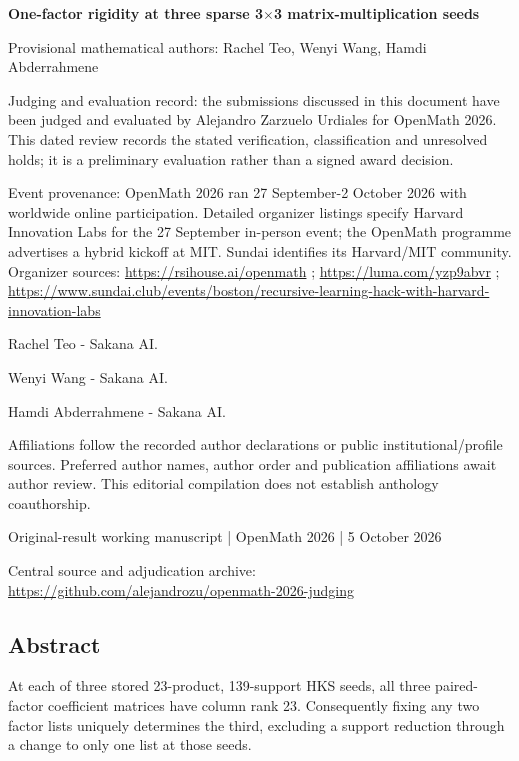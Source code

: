 \documentclass[11pt,a4paper]{article}
\begin{document}
{\LARGE\bfseries One-factor rigidity at three sparse 3\ensuremath{\times}3 matrix-multiplication seeds\par}\medskip
{\small Provisional mathematical authors: Rachel Teo, Wenyi Wang, Hamdi Abderrahmene\par}\medskip
{\small Judging and evaluation record: the submissions discussed in this document have been judged and evaluated by Alejandro Zarzuelo Urdiales for OpenMath 2026. This dated review records the stated verification, classification and unresolved holds; it is a preliminary evaluation rather than a signed award decision.\par}

{\small Event provenance: OpenMath 2026 ran 27 September-2 October 2026 with worldwide online participation. Detailed organizer listings specify Harvard Innovation Labs for the 27 September in-person event; the OpenMath programme advertises a hybrid kickoff at MIT. Sundai identifies its Harvard/MIT community. Organizer sources: \url{https://rsihouse.ai/openmath} ; \url{https://luma.com/yzp9abvr} ; \url{https://www.sundai.club/events/boston/recursive-learning-hack-with-harvard-innovation-labs}\par}

{\small Rachel Teo  -  Sakana AI.\par}

{\small Wenyi Wang  -  Sakana AI.\par}

{\small Hamdi Abderrahmene  -  Sakana AI.\par}

{\small Affiliations follow the recorded author declarations or public institutional/profile sources. Preferred author names, author order and publication affiliations await author review. This editorial compilation does not establish anthology coauthorship.\par}

{\small Original-result working manuscript | OpenMath 2026 | 5 October 2026\par}\medskip
{\small Central source and adjudication archive: \url{https://github.com/alejandrozu/openmath-2026-judging}\par}

\subsection{Abstract}
At each of three stored 23-product, 139-support HKS seeds, all three paired-factor coefficient matrices have column rank 23. Consequently fixing any two factor lists uniquely determines the third, excluding a support reduction through a change to only one list at those seeds.
\end{document}

